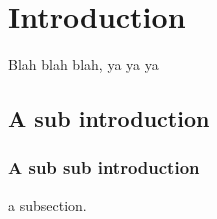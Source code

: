 \section{Introduction}
Blah blah blah, ya ya ya

\subsection{A sub introduction}
\subsubsection{A sub sub introduction}
a subsection.

